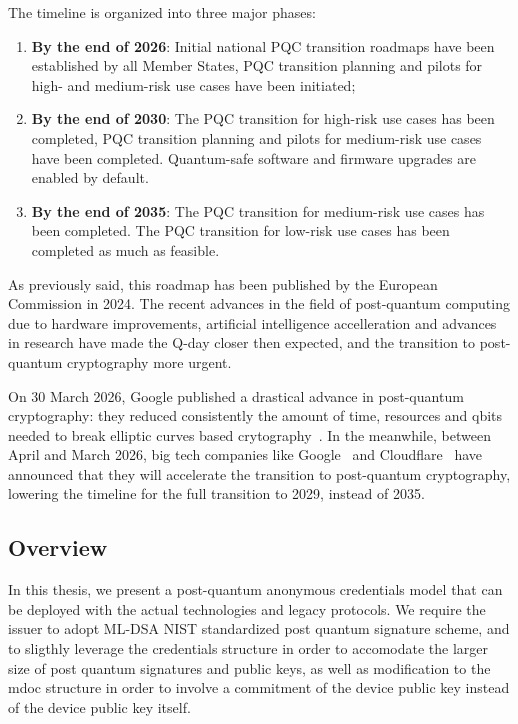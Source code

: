 \documentclass{article}
\begin{document}
The timeline is organized into three major phases:

\begin{enumerate}
    \item \textbf{By the end of 2026}: Initial national PQC transition roadmaps have been established by all Member States, PQC transition planning 
    and pilots for high- and medium-risk use cases have been initiated;
    \item \textbf{By the end of 2030}: The PQC transition for high-risk use cases has been completed, PQC transition planning and pilots for medium-risk
     use cases have been completed. Quantum-safe software and ﬁrmware upgrades are enabled by default.
    \item \textbf{By the end of 2035}: The PQC transition for medium-risk use cases has been completed. The PQC transition for low-risk use cases has been completed as much as feasible.
\end{enumerate}

As previously said, this roadmap has been published by the European Commission in 2024. The recent advances in the field of post-quantum computing
due to hardware improvements, artificial intelligence accelleration and advances in research have made the Q-day closer then expected, and the transition to post-quantum cryptography 
more urgent. 

On 30 March 2026, Google published a drastical advance in post-quantum cryptography: they reduced consistently the amount of time, resources and qbits needed to break  
elliptic curves based crytography~\cite{cryptoeprint:2026/625}. In the meanwhile, between April and March 2026, big tech companies like Google~\cite{Adkins2026Google} 
and Cloudflare~\cite{Westerbaan2026Cloudflare} have announced that they will accelerate the transition to post-quantum cryptography,
lowering the timeline for the full transition to 2029, instead of 2035.

\subsection{Overview}
\label{overview}
In this thesis, we present a post-quantum anonymous credentials model that can be deployed with the actual technologies and legacy protocols.
We require the issuer to adopt ML-DSA NIST standardized post quantum signature scheme, and to sligthly leverage the credentials structure in order 
to accomodate the larger size of post quantum signatures and public keys, as well as modification to the mdoc structure in order to involve a commitment
of the device public key instead of the device public key itself. 
\end{document}
